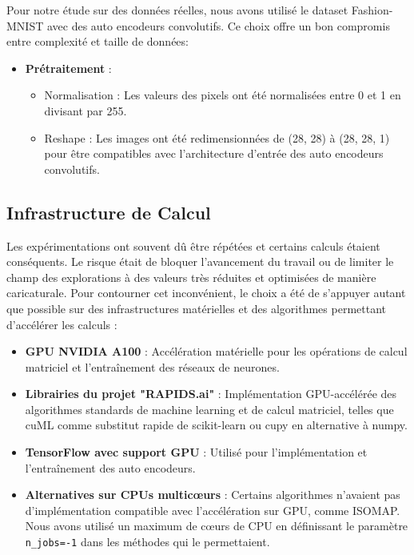 \documentclass[unnumsec,webpdf,modern,large]{projet_manifold}%
\theoremstyle{thmstyleone}%
\theoremstyle{thmstyletwo}%
\theoremstyle{thmstylethree}%
\begin{document}
Pour notre étude sur des données réelles, nous avons utilisé le dataset Fashion-MNIST \cite{xiao2017fashion} avec des auto encodeurs convolutifs. Ce choix offre un bon compromis entre complexité et taille de données:

\begin{itemize}

    \item \textbf{Prétraitement} :
    \begin{itemize}
        \item Normalisation : Les valeurs des pixels ont été normalisées entre 0 et 1 en divisant par 255.
        \item Reshape : Les images ont été redimensionnées de (28, 28) à (28, 28, 1) pour être compatibles avec l'architecture d'entrée des auto encodeurs convolutifs.
    \end{itemize}
\end{itemize}

\subsection{Infrastructure de Calcul}

Les expérimentations ont souvent dû être répétées et certains calculs étaient conséquents. Le risque était de bloquer l'avancement du travail ou de limiter le champ des explorations à des valeurs très réduites et optimisées de manière caricaturale. Pour contourner cet inconvénient, le choix a été de s'appuyer autant que possible sur des infrastructures matérielles et des algorithmes permettant d'accélérer les calculs :

\begin{itemize}
    \item \textbf{GPU NVIDIA A100} : Accélération matérielle pour les opérations de calcul matriciel et l'entraînement des réseaux de neurones.
    
    \item \textbf{Librairies du projet "RAPIDS.ai"} : Implémentation GPU-accélérée des algorithmes standards de machine learning et de calcul matriciel, telles que cuML comme substitut rapide de scikit-learn ou cupy en alternative à numpy.
    
    \item \textbf{TensorFlow avec support GPU} : Utilisé pour l'implémentation et l'entraînement des auto encodeurs.
    
    \item \textbf{Alternatives sur CPUs multicœurs} : Certains algorithmes n'avaient pas d'implémentation compatible avec l'accélération sur GPU, comme ISOMAP. Nous avons utilisé un maximum de cœurs de CPU en définissant le paramètre \texttt{n\_jobs=-1} dans les méthodes qui le permettaient.
\end{itemize}
\end{document}
